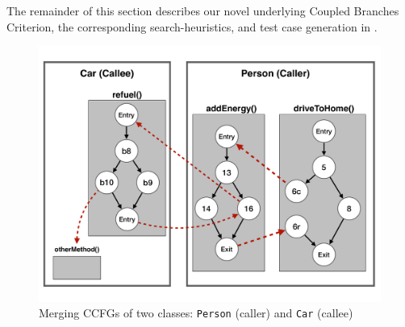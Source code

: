 The remainder of this section describes our novel underlying Coupled Branches Criterion, the corresponding search-heuristics, and test case generation in \cling. 


%

\begin{figure}[t]
	\includegraphics[width=1.0\linewidth]{papers/cling/figures/CCFG_merge}
	\caption{Merging CCFGs of two classes: \texttt{Person} (caller) and \texttt{Car} (callee)}
  \label{fig:CCFF_new}
\end{figure}





